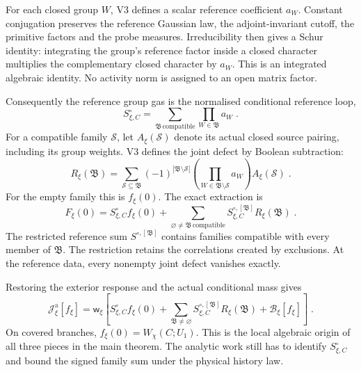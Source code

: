 \documentclass[11pt,a4paper]{article}
\begin{document}
For each closed group $W$, V3 defines a scalar reference coefficient $a_W$. Constant conjugation preserves the reference Gaussian law, the adjoint-invariant cutoff, the primitive factors and the probe measures. Irreducibility then gives a Schur identity: integrating the group's reference factor inside a closed character multiplies the complementary closed character by $a_W$. This is an integrated algebraic identity. No activity norm is assigned to an open matrix factor.

Consequently the reference group gas is the normalised conditional reference loop,
\begin{equation*}
    S^\circ_{\xi,C}
        =\sum_{\mathfrak B\,\mathrm{compatible}}
            \prod_{W\in \mathfrak B}a_W\;.
\end{equation*}
For a compatible family $\mathcal S$, let $A_\xi(\mathcal S)$ denote its actual closed source pairing, including its group weights. V3 defines the joint defect by Boolean subtraction:
\begin{equation*}
    R_\xi(\mathfrak B)
        =\sum_{\mathcal S\subseteq \mathfrak B}
            (-1)^{|\mathfrak B\setminus\mathcal S|}
            \left(\prod_{W\in \mathfrak B\setminus\mathcal S}a_W\right)
            A_\xi(\mathcal S)\;.
\end{equation*}
For the empty family this is $f_\xi(0)$. The exact extraction is
\begin{equation*}
    F_\xi(0)=S^\circ_{\xi,C}f_\xi(0)
        +\sum_{\varnothing\ne \mathfrak B\,\mathrm{compatible}}
            S^{\circ,[\mathfrak B]}_{\xi,C}R_\xi(\mathfrak B)\;.
\end{equation*}
The restricted reference sum $S^{\circ,[\mathfrak B]}$ contains families compatible with every member of $\mathfrak B$. The restriction retains the correlations created by exclusions. At the reference data, every nonempty joint defect vanishes exactly.

Restoring the exterior response and the actual conditional mass gives
\begin{equation*}
    \mathcal J^{\mathrm a}_\xi[f_\xi]
        =\mathsf w_\xi\left[
            S^\circ_{\xi,C}f_\xi(0)
            +\sum_{\mathfrak B\ne \varnothing}
                S^{\circ,[\mathfrak B]}_{\xi,C}R_\xi(\mathfrak B)
            +\mathcal B_\xi[f_\xi]\right]\;.
\end{equation*}
On covered branches, $f_\xi(0)=W_\chi(C;U_1)$. This is the local algebraic origin of all three pieces in the main theorem. The analytic work still has to identify $S^\circ_{\xi,C}$ and bound the signed family sum under the physical history law.
\end{document}
